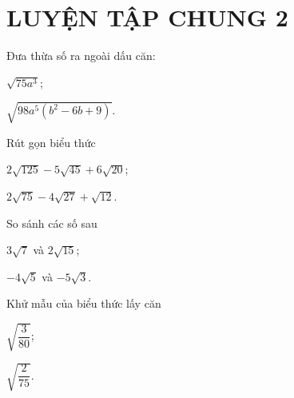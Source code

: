 \section*{LUYỆN TẬP CHUNG 2}
\begin{bt}%
	Đưa thừa số ra ngoài dấu căn:
	\begin{listEX}[2]
	\item $\sqrt{75 a^3}$; 
	\item $\sqrt{98 a^5\left(b^2-6 b+9\right)}$. 
	\end{listEX}
\end{bt}
\begin{bt}%
	Rút gọn biểu thức 
	\begin{listEX}[2]
	\item $2 \sqrt{125}-5 \sqrt{45}+6 \sqrt{20}$; 
	\item $2 \sqrt{75}-4 \sqrt{27}+\sqrt{12}$. 
	\end{listEX}
\end{bt}
\begin{bt}%
	So sánh các số sau
	\begin{listEX}[2]
	\item $3\sqrt{7}$ và $2\sqrt{15}$;
	\item $-4\sqrt{5}$ và $-5\sqrt{3}$.
	\end{listEX}
\end{bt}
\begin{bt}%
	Khử mẫu của biểu thức lấy căn
	\begin{listEX}[2]
	\item $\sqrt{\dfrac{3}{80}}$; 
	\item $\sqrt{\dfrac{2}{75}}$. 
	\end{listEX}
\end{bt}
